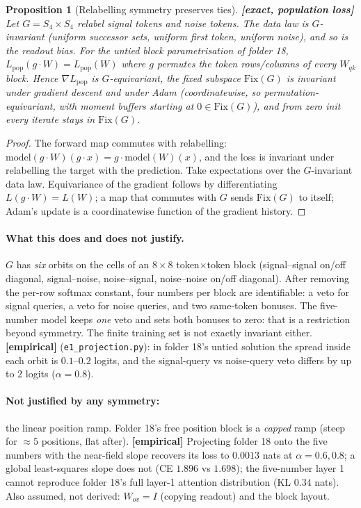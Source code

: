 \documentclass[11pt]{article}
\newtheorem{proposition}{Proposition}
\theoremstyle{definition}
\theoremstyle{remark}
\newcommand{\1}{\mathbf{1}}
\begin{document}
\begin{proposition}[Relabelling symmetry preserves ties] \textbf{[exact, population loss]}
Let $G=S_4\times S_4$ relabel signal tokens and noise tokens. The data law is $G$-invariant
(uniform successor sets, uniform first token, uniform noise), and so is the readout bias. For
the untied block parametrisation of folder 18, $L_{\mathrm{pop}}(g\cdot W)=L_{\mathrm{pop}}(W)$
where $g$ permutes the token rows/columns of every $W_{qk}$ block. Hence
$\nabla L_{\mathrm{pop}}$ is $G$-equivariant, the fixed subspace $\mathrm{Fix}(G)$ is invariant
under gradient descent \emph{and under Adam} (coordinatewise, so permutation-equivariant, with
moment buffers starting at $0\in\mathrm{Fix}(G)$), and from zero init every iterate stays in
$\mathrm{Fix}(G)$.
\end{proposition}
\begin{proof}
The forward map commutes with relabelling: $\mathrm{model}(g\cdot W)(g\cdot x)=g\cdot
\mathrm{model}(W)(x)$, and the loss is invariant under relabelling the target with the
prediction. Take expectations over the $G$-invariant data law. Equivariance of the gradient
follows by differentiating $L(g\cdot W)=L(W)$; a map that commutes with $G$ sends $\mathrm{Fix}(G)$
to itself; Adam's update is a coordinatewise function of the gradient history.
\end{proof}

\paragraph{What this does and does not justify.} $G$ has \emph{six} orbits on the cells of an
$8\times8$ token$\times$token block (signal--signal on/off diagonal, signal--noise,
noise--signal, noise--noise on/off diagonal). After removing the per-row softmax constant, four
numbers per block are identifiable: a veto for signal queries, a veto for noise queries, and two
same-token bonuses. The five-number model keeps \emph{one} veto and sets both bonuses to zero:
that is a restriction beyond symmetry. The finite training set is not exactly invariant either.
\textbf{[empirical]} (\texttt{e1\_projection.py}): in folder 18's untied solution the spread
inside each orbit is $0.1$--$0.2$ logits, and the signal-query vs noise-query veto differs by up
to $2$ logits ($\alpha=0.8$).

\paragraph{Not justified by any symmetry:} the linear position ramp. Folder 18's free position
block is a \emph{capped} ramp (steep for $\approx5$ positions, flat after). \textbf{[empirical]}
Projecting folder 18 onto the five numbers with the near-field slope recovers its loss to
$0.0013$ nats at $\alpha=0.6,0.8$; a global least-squares slope does not (CE $1.896$ vs
$1.698$); the five-number layer 1 cannot reproduce folder 18's full layer-1 attention
distribution (KL $0.34$ nats). Also assumed, not derived: $W_{ov}=I$ (copying readout) and the
block layout.
\end{document}
